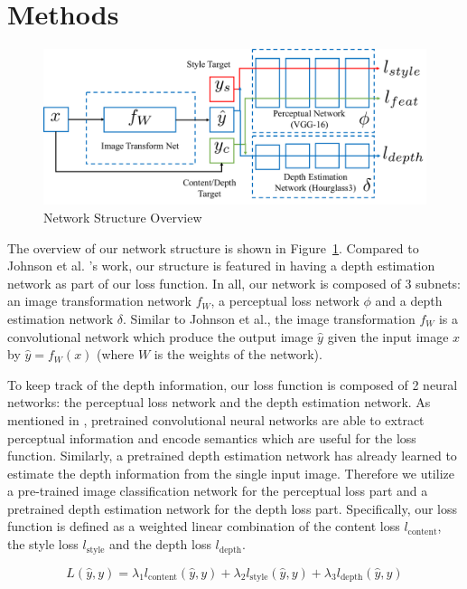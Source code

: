 \documentclass[10pt,twocolumn,letterpaper]{article}
\begin{document}
\section{Methods}

\begin{figure}[h]
\centering
\includegraphics[scale=0.4]{network_structure.pdf}
\caption{Network Structure Overview}
\label{fig:overview}
\end{figure}

The overview of our network structure is shown in Figure~\ref{fig:overview}. Compared to Johnson et al. \cite{johnson2016perceptual}'s work, our structure is featured in having a depth estimation network as part of our loss function. In all, our network is composed of 3 subnets: an image transformation network $f_W$, a perceptual loss network $\phi$ and a depth estimation network $\delta$. Similar to Johnson et al., the image transformation $f_W$ is a convolutional network which produce the output image $\hat y$ given the input image $x$ by $\hat y = f_W(x)$ (where $W$ is the weights of the network).

To keep track of the depth information, our loss function is composed of 2 neural networks: the perceptual loss network and the depth estimation network. As mentioned in \cite{johnson2016perceptual}, pretrained convolutional neural networks are able to extract perceptual information and encode semantics which are useful for the loss function. Similarly, a pretrained depth estimation network has already learned to estimate the depth information from the single input image. Therefore we utilize a pre-trained image classification network for the perceptual loss part and a pretrained depth estimation network for the depth loss part. Specifically, our loss function is defined as a weighted linear combination of the content loss $l_\text{content}$, the style loss $l_\text{style}$ and the depth loss $l_\text{depth}$. 

\[L(\hat y, y) = \lambda_1 l_\text{content}(\hat y, y) + \lambda_2 l_\text{style}(\hat y, y) + \lambda_3 l_\text{depth}(\hat y, y)\]
\end{document}
